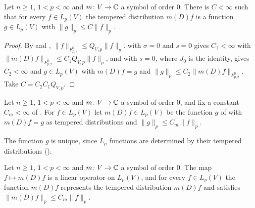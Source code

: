 \begin{theorem}
\label{thm:mihlin-symbols}
\leanok
{}
Let $n \geq 1$, $1 < p < \infty$ and $m \colon V \to \mathbb{C}$ a symbol of order $0$. There is
$C < \infty$ such that for every $f \in L_p(V)$ the tempered distribution $m(D) f$ is a function
$g \in L_p(V)$ with $\|g\|_p \leq C \|f\|_p$.
\end{theorem}

\begin{proof}
\leanok
By  and ,
$\|f\|_{F^0_{p,2}} \leq Q_{V,p} \|f\|_p$.  with $\sigma = 0$ and $s = 0$
gives $C_1 < \infty$ with $\|m(D) f\|_{F^0_{p,2}} \leq C_1 Q_{V,p} \|f\|_p$, and
 with $s = 0$, where $J_0$ is the identity, gives
$C_2 < \infty$ and $g \in L_p(V)$ with $m(D) f = g$ and
$\|g\|_p \leq C_2 \|m(D) f\|_{F^0_{p,2}}$. Take $C = C_2 C_1 Q_{V,p}$.
\end{proof}

\begin{definition}
\label{def:symbol-lp}
\leanok
{}
Let $n \geq 1$, $1 < p < \infty$ and $m \colon V \to \mathbb{C}$ a symbol of order $0$, and fix a constant
$C_m < \infty$ of . For $f \in L_p(V)$ let $m(D) f \in L_p(V)$ be the
function $g$ of  with $m(D) f = g$ as tempered distributions and
$\|g\|_p \leq C_m \|f\|_p$.
\end{definition}

The function $g$ is unique, since $L_p$ functions are determined by their tempered distributions
().

\begin{lemma}
\label{lem:symbol-lp-bounded}
\leanok
{}
Let $n \geq 1$, $1 < p < \infty$ and $m \colon V \to \mathbb{C}$ a symbol of order $0$. The map
$f \mapsto m(D) f$ is a linear operator on $L_p(V)$, and for every $f \in L_p(V)$ the function
$m(D) f$ represents the tempered distribution $m(D) f$ and satisfies
$\|m(D) f\|_p \leq C_m \|f\|_p$.
\end{lemma}

